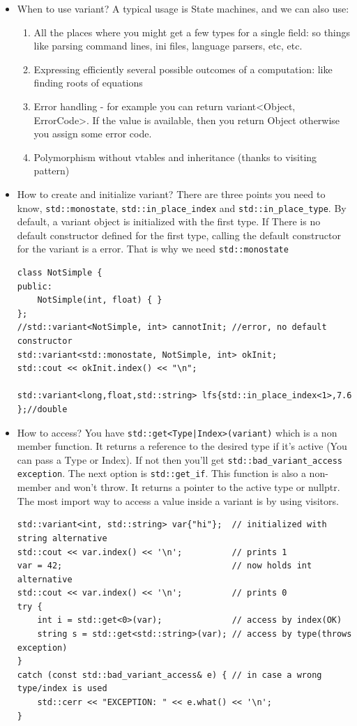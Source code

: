 \documentclass[a4paper,11pt,twoside]{book}
\begin{document}
\begin{itemize}
	\item When to use variant? A typical usage is State machines, and we can also use:
	\begin{enumerate}
		\item All the places where you might get a few types for a single field: so things like parsing command lines, ini files, language parsers, etc, etc.
		\item Expressing efficiently several possible outcomes of a computation: like finding roots of equations
		\item Error handling - for example you can return variant<Object, ErrorCode>. If the value is available, then you return Object otherwise you assign some error code.
		\item Polymorphism without vtables and inheritance (thanks to visiting pattern)
	\end{enumerate}
	
	\item How to create and initialize variant? There are three points you need to know, \texttt{std::monostate}, \texttt{std::in\_place\_index} and \texttt{std::in\_place\_type}. By default, a variant object is initialized with the first type. If There is no default constructor defined for the first type, calling the default constructor for the variant is a error. That is why we need \texttt{std::monostate}
	
\begin{lstlisting}
class NotSimple {
public:
	NotSimple(int, float) { }
};
//std::variant<NotSimple, int> cannotInit; //error, no default constructor
std::variant<std::monostate, NotSimple, int> okInit;
std::cout << okInit.index() << "\n";

std::variant<long,float,std::string> lfs{std::in_place_index<1>,7.6 };//double
\end{lstlisting}	
	
	\item How to access?  You have \texttt{std::get<Type|Index>(variant)} which is a non member function. It returns a reference to the desired type if it’s active (You can pass a Type or Index). If not then you’ll get \texttt{std::bad\_variant\_access exception}. The next option is \texttt{std::get\_if}. This function is also a non-member and won’t throw. It returns a pointer to the active type or nullptr. The most import way to access a value inside a variant is by using visitors.
	
\begin{lstlisting}
std::variant<int, std::string> var{"hi"};  // initialized with string alternative
std::cout << var.index() << '\n';          // prints 1
var = 42;                                  // now holds int alternative
std::cout << var.index() << '\n';          // prints 0
try {
	int i = std::get<0>(var);              // access by index(OK)
	string s = std::get<std::string>(var); // access by type(throws exception)
}
catch (const std::bad_variant_access& e) { // in case a wrong type/index is used
	std::cerr << "EXCEPTION: " << e.what() << '\n';
}
\end{lstlisting}	
	

\end{itemize}
\end{document}
